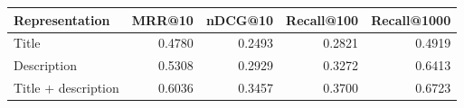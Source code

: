 \begin{tabular}{lrrrr}
    \toprule
    Representation & MRR@10 & nDCG@10 & Recall@100 & Recall@1000 \\
    \midrule
    Title & 0.4780 & 0.2493 & 0.2821 & 0.4919 \\
    Description & 0.5308 & 0.2929 & 0.3272 & 0.6413 \\
    Title + description & 0.6036 & 0.3457 & 0.3700 & 0.6723 \\
    \bottomrule
\end{tabular}
